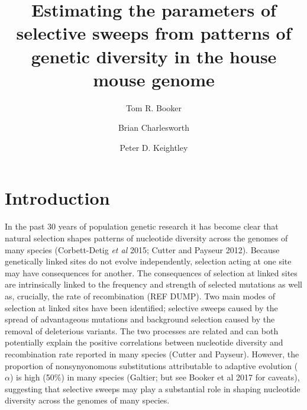 \documentclass[11pt]{article}
\title{\textbf{Estimating the parameters of selective sweeps from patterns of genetic diversity in the house mouse genome}}
\author[1,*]{Tom R. Booker}
\author[1]{Brian Charlesworth}
\author[1]{Peter D. Keightley}
\affil[1]{Institute of Evolutionary Biology, University of Edinburgh, Edinburgh}
\affil[*]{\emph{t.r.booker@sms.ed.ac.uk}}
\begin{document}
\maketitle
\begin{abstract}


\end{abstract}

%
%

\section*{Introduction}

In the past 30 years of population genetic research it has become clear that natural selection shapes patterns of nucleotide diversity across the genomes of many species (Corbett-Detig \textit{et al} 2015; Cutter and Payseur 2012). Because genetically linked sites do not evolve independently, selection acting at one site may have consequences for another. The consequences of selection at linked sites are intrinsically linked to the frequency and strength of selected mutations as well as, crucially, the rate of recombination (REF DUMP). Two main modes of selection at linked sites have been identified; selective sweeps caused by the spread of advantageous mutations and background selection caused by the removal of deleterious variants. The two processes are related and can both potentially explain the positive correlations between nucleotide diversity and recombination rate reported in many species (Cutter and Payseur). However, the proportion of nonsynyonomous substitutions attributable to adaptive evolution ($\alpha$) is  high (50\%) in many species (Galtier; but see Booker et al 2017 for caveats), suggesting that selective sweeps may play a substantial role in shaping nucleotide diversity across the genomes of many species.
\end{document}

